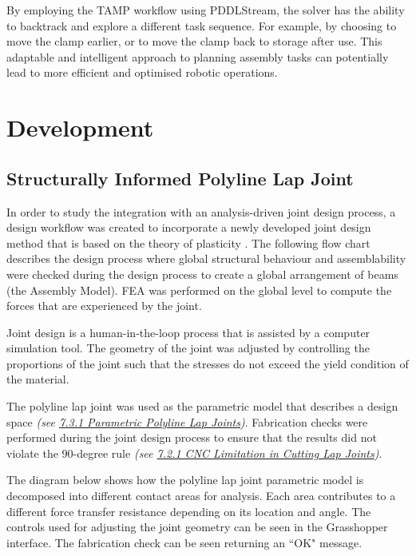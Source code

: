 By employing the TAMP workflow using PDDLStream, the solver has the ability to backtrack and explore a different task sequence. For example, by choosing to move the clamp earlier, or to move the clamp back to storage after use. This adaptable and intelligent approach to planning assembly tasks can potentially lead to more efficient and optimised robotic operations.

\section{Development}

\subsection{Structurally Informed Polyline Lap Joint}

In order to study the integration with an analysis-driven joint design process, a design workflow was created to incorporate a newly developed joint design method that is based on the theory of plasticity \parencite{tanadiniLimitAnalysisTimber2023}. The following flow chart describes the design process where global structural behaviour and assemblability were checked during the design process to create a global arrangement of beams (the Assembly Model). FEA was performed on the global level to compute the forces that are experienced by the joint. 

Joint design is a human-in-the-loop process that is assisted by a computer simulation tool. The geometry of the joint was adjusted by controlling the proportions of the joint such that the stresses do not exceed the yield condition of the material.




The polyline lap joint was used as the parametric model that describes a design space \textit{(see \ul{7.3.1 Parametric Polyline Lap Joints})}. Fabrication checks were performed during the joint design process to ensure that the results did not violate the 90-degree rule \textit{(see \ul{7.2.1 CNC Limitation in Cutting Lap Joints})}. 

The diagram below shows how the polyline lap joint parametric model is decomposed into different contact areas for analysis. Each area contributes to a different force transfer resistance depending on its location and angle. The controls used for adjusting the joint geometry can be seen in the Grasshopper interface. The fabrication check can be seen returning an ``OK" message.

